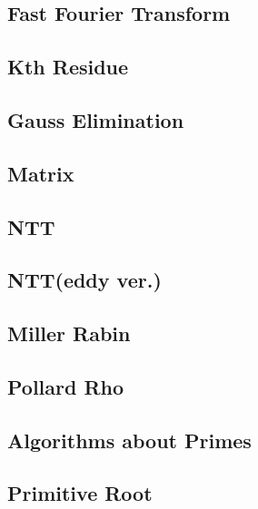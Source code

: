 \documentclass[a4paper,10pt,twocolumn,oneside]{article}
\begin{document}
\subsection{Fast Fourier Transform}


\subsection{Kth Residue}


\subsection{Gauss Elimination}


\subsection{Matrix}


\subsection{NTT}


\subsection{NTT(eddy ver.)}


\subsection{Miller Rabin}


\subsection{Pollard Rho}


\subsection{Algorithms about Primes}


\subsection{Primitive Root}

\end{document}
